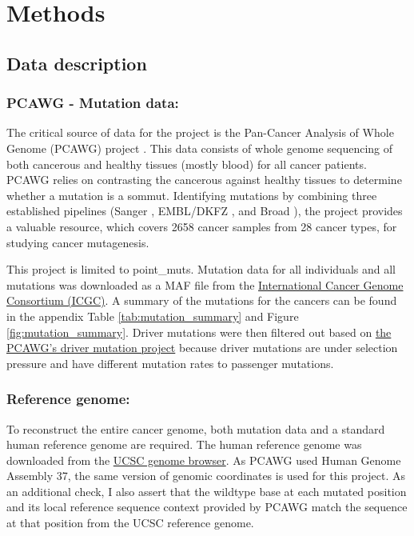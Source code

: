 \chapter{Methods}

\section{Data description}
\subsection{PCAWG - Mutation data:} 
The critical source of data for the project is the Pan-Cancer Analysis of Whole Genome (PCAWG) project \citep{Campbell2020}. This data consists of whole genome sequencing of both cancerous and healthy tissues (mostly blood) for all cancer patients. PCAWG relies on contrasting the cancerous against healthy tissues to determine whether a mutation is a \gls{sommut}. Identifying mutations by combining three established pipelines (Sanger \citep{Jones2016CgpCaVEManWrapper:Data}, EMBL/DKFZ \citep{A2014IntegratingApplications}, and Broad \citep{K2013SensitiveSamples}), the project provides a valuable resource, which covers 2658 cancer samples from 28 cancer types, for studying cancer mutagenesis.

This project is limited to \glspl{point_mut}. Mutation data for all individuals and all mutations was downloaded as a MAF file from the \href{https://dcc.icgc.org/releases/PCAWG/consensus_snv_indel}{International Cancer Genome Consortium (ICGC)}. A summary of the mutations for the cancers can be found in the appendix Table \ref{tab:mutation_summary} and Figure \ref{fig:mutation_summary}. Driver mutations were then filtered out based on \href{https://dcc.icgc.org/releases/PCAWG/driver_mutations}{the PCAWG's driver mutation project} because driver mutations are under selection pressure and have different mutation rates to passenger mutations. 

\subsection{Reference genome:} 
To reconstruct the entire cancer genome, both mutation data and a standard human reference genome are required. The human reference genome was downloaded from the \href{http://hgdownload.soe.ucsc.edu/goldenPath/hg19/chromosomes}{UCSC genome browser}. As PCAWG used Human Genome Assembly 37, the same version of genomic coordinates is used for this project. As an additional check, I also assert that the wildtype base at each mutated position and its local reference sequence context provided by PCAWG match the sequence at that position from the UCSC reference genome. 

